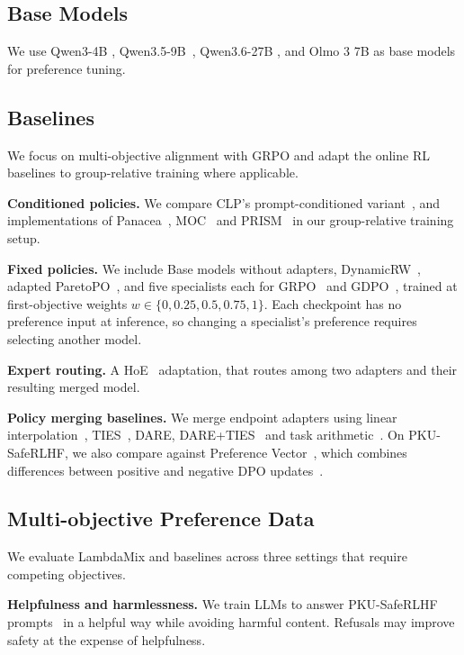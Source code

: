 \documentclass{article} %
\begin{document}
\subsection{Base Models}

We use Qwen3-4B \citep{qwen3technicalreport}, Qwen3.5-9B~\citep{qwen3.5}, Qwen3.6-27B \citep{qwen3.6-27b}, and Olmo 3 7B \citep{Olmo2025Olmo3} as base models for preference tuning. 

\subsection{Baselines}
We focus on multi-objective alignment with GRPO and adapt the online RL baselines to group-relative training where applicable.

\textbf{Conditioned policies.}
We compare CLP's prompt-conditioned variant~\citep{wang-etal-2024-conditional}, and implementations of Panacea~\citep{zhong2024panacea}, MOC~\citep{moc2026} and PRISM~\citep{liang2026prism} in our group-relative training setup.

\textbf{Fixed policies.}
We include Base models without adapters, DynamicRW~\citep{lu2025dynamicweighting}, adapted ParetoPO~\citep{paretopo2026}, and five specialists each for GRPO~\citep{shao2024deepseekmath} and GDPO~\citep{liu2026gdpo}, trained at first-objective weights $w\in\{0,0.25,0.5,0.75,1\}$. Each checkpoint has no preference input at inference, so changing a specialist's preference requires selecting another model.

\textbf{Expert routing.}
A HoE~\citep{li2026hoe} adaptation, that routes among two adapters and their resulting merged model.


\textbf{Policy merging baselines.} We merge endpoint adapters using linear interpolation~\citep{rame2024rewarded}, TIES~\citep{yadav2023ties}, DARE, DARE+TIES~\citep{yu2024dare} and task arithmetic~\citep{ilharco2023task}. On PKU-SafeRLHF, we also compare against Preference Vector~\citep{prefvector2026}, which combines differences between positive and negative DPO updates~\citep{rafailov2023direct}.


\subsection{Multi-objective Preference Data}

We evaluate LambdaMix and baselines across three settings that require competing objectives.

\textbf{Helpfulness and harmlessness.} We train LLMs to answer PKU-SafeRLHF prompts~\citep{ji-etal-2025-pku} in a helpful way while avoiding harmful content. Refusals may improve safety at the expense of helpfulness.
\end{document}
